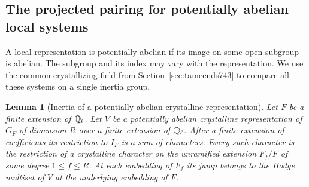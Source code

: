 \documentclass[a4paper,11pt]{article}
\newtheorem{lemma}[proposition]{Lemma}
\theoremstyle{definition}
\theoremstyle{remark}
\numberwithin{equation}{section}
\begin{document}
\subsection{The projected pairing for potentially abelian local systems}
\label{sec:potentialperiod746}
A local representation is potentially abelian if its image on
some open subgroup is abelian. The subgroup and its index may
vary with the representation. We use the common crystallizing
field from Section~\ref{sec:tameends743} to compare all these
systems on a single inertia group.

\begin{lemma}[Inertia of a potentially abelian crystalline representation]
\leavevmode\label{lem:potinertia746}
Let \(F\) be a finite extension of \(\mathbb Q_\ell\). Let \(V\) be a
potentially abelian crystalline representation of \(G_F\) of
dimension \(R\) over a finite extension of \(\mathbb Q_\ell\).
After a finite extension of coefficients its restriction to \(I_F\)
is a sum of characters. Every such character is the restriction
of a crystalline character on the unramified extension \(F_f/F\)
of some degree \(1\le f\le R\). At each embedding of \(F_f\) its
jump belongs to the Hodge multiset of \(V\) at the underlying
embedding of \(F\).
\end{lemma}
\end{document}
